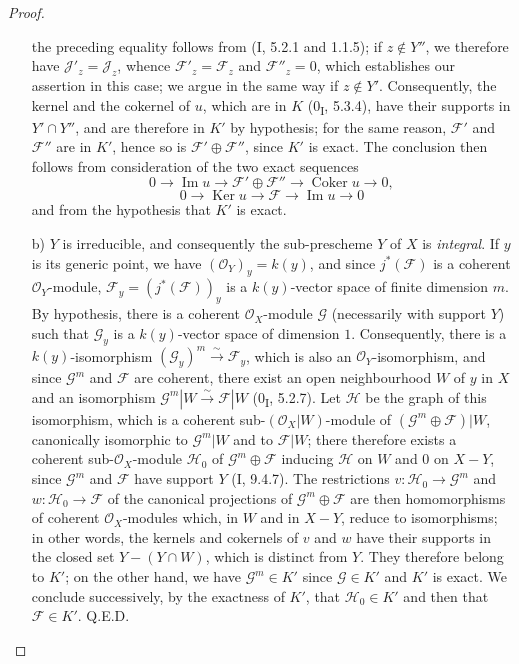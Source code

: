 \begin{proof}
\begin{enumerate}
the preceding equality follows from (I, 5.2.1 and 1.1.5); if $z\notin Y''$, we
therefore have $\mathcal J'_z=\mathcal J_z$, whence $\mathcal F'_z=\mathcal F_z$ and
$\mathcal F''_z=0$, which establishes our assertion in this case; we argue
in the same way if $z\notin Y'$. Consequently, the kernel and the cokernel of $u$,
which are in $K$ (0\textsubscript{I}, 5.3.4), have their supports in $Y'\cap Y''$,
and are therefore in $K'$ by hypothesis; for the same reason, $\mathcal F'$ and
$\mathcal F''$ are in $K'$, hence so is $\mathcal F'\oplus\mathcal F''$,
since $K'$ is exact. The conclusion then follows from consideration of the
two exact sequences
\[
0\longrightarrow\operatorname{Im}u\longrightarrow
\mathcal F'\oplus\mathcal F''\longrightarrow
\operatorname{Coker}u\longrightarrow0,
\]
\[
0\longrightarrow\operatorname{Ker}u\longrightarrow\mathcal F
\longrightarrow\operatorname{Im}u\longrightarrow0
\]
and from the hypothesis that $K'$ is exact.

\item[b)] $Y$ is irreducible, and consequently the sub-prescheme $Y$ of $X$ is
\emph{integral}. If $y$ is its generic point, we have
$(\mathcal O_Y)_y=k(y)$, and since $j^*(\mathcal F)$ is a coherent
$\mathcal O_Y$-module, $\mathcal F_y=(j^*(\mathcal F))_y$ is a
$k(y)$-vector space of finite dimension $m$. By hypothesis, there is a
coherent $\mathcal O_X$-module $\mathcal G$ (necessarily with support $Y$)
such that $\mathcal G_y$ is a $k(y)$-vector space of dimension $1$.
Consequently, there is a $k(y)$-isomorphism
$(\mathcal G_y)^m\xrightarrow{\sim}\mathcal F_y$, which is also an
$\mathcal O_Y$-isomorphism, and since $\mathcal G^m$ and $\mathcal F$ are
coherent, there exist an open neighbourhood $W$ of $y$ in $X$ and an
isomorphism $\mathcal G^m|W\xrightarrow{\sim}\mathcal F|W$
(0\textsubscript{I}, 5.2.7). Let $\mathcal H$ be the graph of this isomorphism,
which is a coherent sub-$(\mathcal O_X|W)$-module of
$(\mathcal G^m\oplus\mathcal F)|W$, canonically isomorphic to
$\mathcal G^m|W$ and to $\mathcal F|W$; there therefore exists a coherent
sub-$\mathcal O_X$-module $\mathcal H_0$ of $\mathcal G^m\oplus\mathcal F$
inducing $\mathcal H$ on $W$ and $0$ on $X-Y$, since $\mathcal G^m$ and
$\mathcal F$ have support $Y$ (I, 9.4.7). The restrictions
$v:\mathcal H_0\to\mathcal G^m$ and $w:\mathcal H_0\to\mathcal F$ of the
canonical projections of $\mathcal G^m\oplus\mathcal F$ are then
homomorphisms of coherent $\mathcal O_X$-modules which, in $W$ and in
$X-Y$, reduce to isomorphisms; in other words, the kernels and
cokernels of $v$ and $w$ have their supports in the closed set
$Y-(Y\cap W)$, which is distinct from $Y$. They therefore belong to $K'$; on the
other hand, we have $\mathcal G^m\in K'$ since $\mathcal G\in K'$ and
$K'$ is exact. We conclude successively, by the exactness of $K'$, that
$\mathcal H_0\in K'$ and then that $\mathcal F\in K'$. Q.E.D.
\end{enumerate}
\end{proof}


